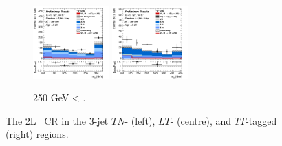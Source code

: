 \begin{figure}[h!]
\begin{subfigure}[b]{\textwidth}
        \includegraphics[width=0.32\textwidth]{Images/VH/Own_fit/prefit_VHcc/Region_distmBB_BMin250_DCRHigh_J3_TTypelt_incJet1_T2_L2_Y6051_Prefit.png}
        \includegraphics[width=0.32\textwidth]{Images/VH/Own_fit/prefit_VHcc/Region_distmBB_BMin250_DCRHigh_J3_TTypett_incJet1_T2_L2_Y6051_Prefit.png}
        \caption{250 GeV < \ptv.}
        \label{fig:plots_VHcc_2L_250_CRH_3J}
    \end{subfigure}
    \caption{The 2L \highdr\ CR in the 3-jet $TN$- (left), $LT$- (centre), and $TT$-tagged (right) regions.}
    \label{fig:plots_VHcc_2L_CRH_3J}
\end{figure}

\vspace*{\fill} \newpage
\vspace*{\fill} 

